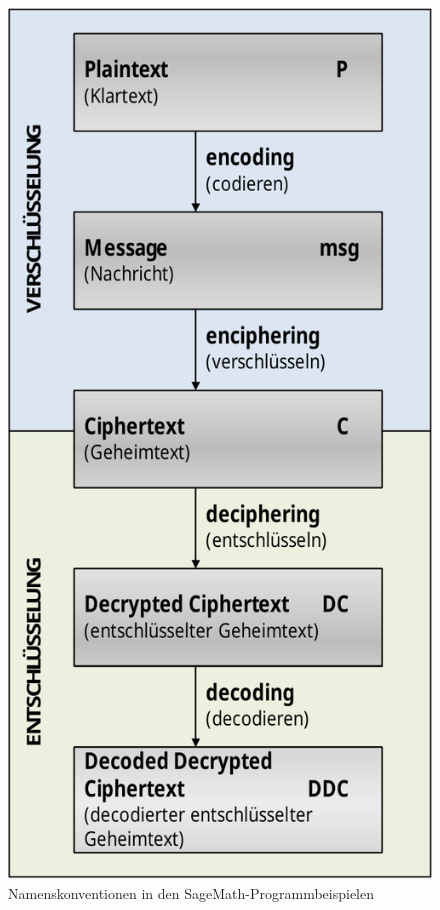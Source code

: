 \begin{refsegment}
\begin{figure}[ht]
\begin{center}
\includegraphics[scale=0.45]{figures/notation-enc-dec_in-sage-scripts_de}
\caption{Namenskonventionen in den SageMath-Programmbeispielen}
\label{naming-convention-in-Sage-cipher-samples}
\end{center}
\end{figure}




\end{refsegment}
